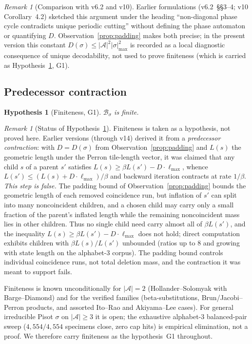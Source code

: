 \documentclass[11pt]{article}
\theoremstyle{plain}
\newtheorem{hypothesis}[theorem]{Hypothesis}
\theoremstyle{definition}
\theoremstyle{remark}
\newtheorem{remark}[theorem]{Remark}
\newcommand{\A}{\mathcal{A}}
\newcommand{\B}{\mathcal{B}}
\begin{document}
\begin{remark}[Comparison with v6.2 and v10]\label{rem:padding-history}
Earlier formulations (v6.2~\S\S 3--4; v10 Corollary~4.2) sketched this argument under the heading ``non-diagonal phase cycle contradicts unique periodic cutting'' without defining the phase automaton or quantifying $D$. Observation~\ref{prop:padding} makes both precise; in the present version this constant $D(\sigma)\le|\A|^2|\sigma|_{\max}^2$ is recorded as a local diagnostic consequence of unique decodability, not used to prove finiteness (which is carried as Hypothesis~\ref{thm:finiteness}, G1).
\end{remark}

\subsection{Predecessor contraction}

\begin{hypothesis}[Finiteness, G1]\label{thm:finiteness}
$\B_\sigma$ is finite.
\end{hypothesis}

\begin{remark}[Status of Hypothesis~\ref{thm:finiteness}]
Finiteness is taken as a hypothesis, not proved here. Earlier versions
(through v14) derived it from a \emph{predecessor contraction}: with
$D=D(\sigma)$ from Observation~\ref{prop:padding} and $L(s)$ the
geometric length under the Perron tile-length vector, it was claimed
that any child $s$ of a parent $s'$ satisfies $L(s)\ge\beta
L(s')-D\cdot\ell_{\max}$, whence $L(s')\le(L(s)+D\cdot\ell_{\max})/\beta$
and backward iteration contracts at rate $1/\beta$. \emph{This step is
false.} The padding bound of Observation~\ref{prop:padding} bounds the
geometric length of each removed coincidence run, but inflation of $s'$
can split into many noncoincident children, and a chosen child may
carry only a small fraction of the parent's inflated length while the
remaining noncoincident mass lies in other children. Thus no single
child need carry almost all of $\beta L(s')$, and the inequality
$L(s)\ge\beta L(s')-D\cdot\ell_{\max}$ does not hold; direct computation
exhibits children with $\beta L(s)/L(s')$ unbounded (ratios up to $8$
and growing with state length on the alphabet-$3$ corpus). The padding
bound controls individual coincidence runs, not total deletion mass,
and the contraction it was meant to support fails.

Finiteness is known unconditionally for $|\A|=2$
(Hollander--Solomyak with Barge--Diamond) and for the verified families
(beta-substitutions, Brun/Jacobi--Perron products, and assorted
Ito--Rao and Akiyama--Lee cases). For general irreducible Pisot
$\sigma$ on $|\A|\ge3$ it is open; the exhaustive alphabet-$3$
balanced-pair sweep ($4{,}554/4{,}554$ specimens close, zero cap hits)
is empirical elimination, not a proof. We therefore carry finiteness as
the hypothesis~G1 throughout.
\end{remark}
\end{document}
